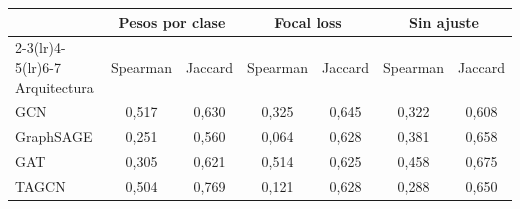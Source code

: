 \begin{tabular}{lcccccc}
\toprule
 & \multicolumn{2}{c}{Pesos por clase} & \multicolumn{2}{c}{Focal loss} & \multicolumn{2}{c}{Sin ajuste} \\
\cmidrule(lr){2-3}\cmidrule(lr){4-5}\cmidrule(lr){6-7}
Arquitectura & Spearman & Jaccard & Spearman & Jaccard & Spearman & Jaccard \\
\midrule
GCN & 0{,}517 & 0{,}630 & 0{,}325 & 0{,}645 & 0{,}322 & 0{,}608 \\
GraphSAGE & 0{,}251 & 0{,}560 & 0{,}064 & 0{,}628 & 0{,}381 & 0{,}658 \\
GAT & 0{,}305 & 0{,}621 & 0{,}514 & 0{,}625 & 0{,}458 & 0{,}675 \\
TAGCN & 0{,}504 & 0{,}769 & 0{,}121 & 0{,}628 & 0{,}288 & 0{,}650 \\
\bottomrule
\end{tabular}
